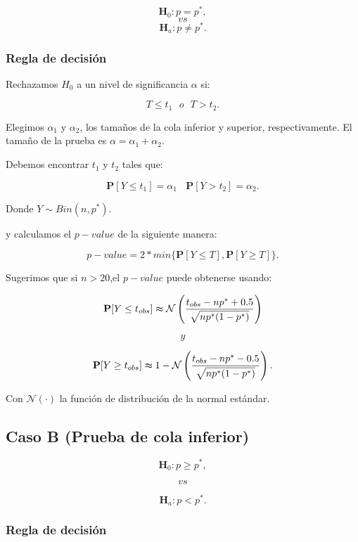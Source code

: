 \documentclass[
  a4paper,
  oneside,
  openany]{book}
\begin{document}
\[\textbf{H}_0: p = p^*,\]
\[vs\]
\[\textbf{H}_a: p \neq p^*.\]

\hypertarget{regla-de-decisiuxf3n}{%
\subsubsection*{Regla de decisión}\label{regla-de-decisiuxf3n}}


Rechazamos \(H_0\) a un nivel de significancia \(\alpha\) si:

\[T \leq t_{1} \ \ \ o \ \ \ T > t_{2}.\]

Elegimos \(\alpha_{1}\) y \(\alpha_{2}\), los tamaños de la cola inferior y superior, respectivamente. El tamaño de la prueba es \(\alpha=\alpha_{1}+\alpha_{2}\).

Debemos encontrar \(t_{1}\) y \(t_{2}\) tales que:

\[\mathbf{P}[Y \leq t_{1}]=\alpha_{1} \ \ \ \ \mathbf{P}[Y > t_{2}]=\alpha_{2}.\]

Donde \(Y \sim Bin (n,p^*)\).

y calculamos el \(p-value\) de la siguiente manera:

\[p-value=2*min \{ \mathbf{P}[Y\leq T],\mathbf{P}[Y \geq T] \}.\]

Sugerimos que si \(n > 20\),el \(p-value\) puede obtenerse usando:

\[\mathbf{P}[Y\leq t_{obs}] \thickapprox \mathcal{N} \left(\frac{t_{obs}-np^*+0.5}{\sqrt{np^*(1-p^*)}}\right)\]

\[y\]

\[\mathbf{P}[Y\geq t_{obs}] \thickapprox 1-\mathcal{N} \left(\frac{t_{obs}-np^*-0.5}{\sqrt{np^*(1-p^*)}}\right).\]

Con \(\mathcal{N}(\cdot)\) la función de distribución de la normal estándar.

\hypertarget{caso-b-prueba-de-cola-inferior}{%
\subsection*{Caso B (Prueba de cola inferior)}\label{caso-b-prueba-de-cola-inferior}}


\[\textbf{H}_0: p  \geq p^*,\]

\[vs\]

\[\textbf{H}_a: p <p^*.\]

\hypertarget{regla-de-decisiuxf3n-1}{%
\subsubsection*{Regla de decisión}\label{regla-de-decisiuxf3n-1}}
\end{document}
